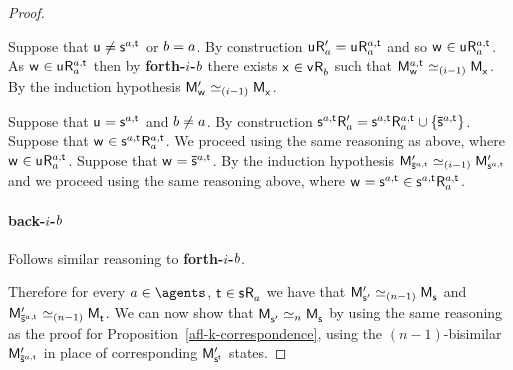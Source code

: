 \begin{proof}
\begin{enumerate}
        Suppose that $\aStateU \neq \aStateS[\agentA,\aStateT]$ or $b = a$.
        By construction $\aStateU \aAccessibility[\prime]{\agentA} = \aStateU \aAccessibility[\agentA,\aStateT]{\agentA}$ and so $\aStateW \in \aStateU \aAccessibility[\agentA,\aStateT]{\agentA}$. 
        As $\aStateW \in \aStateU \aAccessibility[\agentA,\aStateT]{\agentA}$ then by {\bf forth-$i$-$b$} there exists $\aStateX \in \aStateV \aAccessibility{\agentB}$ such that $\aPModel[\agentA,\aStateT]{\aStateW} \bisimilar[(i - 1)] \aPModel{\aStateX}$.
        By the induction hypothesis $\aPModel[\prime]{\aStateW} \bisimilar[(i - 1)] \aPModel{\aStateX}$.

        Suppose that $\aStateU = \aStateS[\agentA,\aStateT]$ and $b \neq a$. 
        By construction $\aStateS[\agentA,\aStateT] \aAccessibility[\prime]{\agentA} = \aStateS[\agentA,\aStateT] \aAccessibility[\agentA,\aStateT]{\agentA} \cup \{\aPStateS[\agentA,\aStateT]\}$. 
        Suppose that $\aStateW \in \aStateS[\agentA,\aStateT] \aAccessibility[\agentA,\aStateT]{\agentA}$. 
        We proceed using the same reasoning as above, where $\aStateW \in \aStateU \aAccessibility[\agentA,\aStateT]{\agentA}$. 
        Suppose that $\aStateW = \aPStateS[\agentA,\aStateT]$.
        By the induction hypothesis $\aPModel[\prime]{\aPStateS[\agentA,\aStateT]} \bisimilar[(i - 1)] \aPModel[\prime]{\aStateS[\agentA,\aStateT]}$ and we proceed using the same reasoning above, where $\aStateW = \aStateS[\agentA,\aStateT] \in \aStateS[\agentA,\aStateT] \aAccessibility[\agentA,\aStateT]{\agentA}$.

        \paragraph{back-$i$-$b$} Follows similar reasoning to {\bf forth-$i$-$b$}.
\end{enumerate}

Therefore for every $\agentA \in \agents$, $\aStateT \in \aStateS \aAccessibility{\agentA}$ we have that $\aPModel[\prime]{\aStateS[\prime]} \bisimilar[(n - 1)] \aPModel{\aStateS}$ and $\aPModel[\prime]{\aPStateS[\agentA,\aStateT]} \bisimilar[(n - 1)] \aPModel{\aStateT}$.
We can now show that $\aPModel{\aStateS[\prime]} \bisimilar[n] \aPModel{\aStateS}$ by using the same reasoning as the proof for Proposition~\ref{afl-k-correspondence}, using the $(n-1)$-bisimilar $\aPModel[\prime]{\aPStateS[\agentA,\aStateT]}$ in place of corresponding $\aPModel[\prime]{\aStateS[\aStateT]}$ states.
\end{proof}

